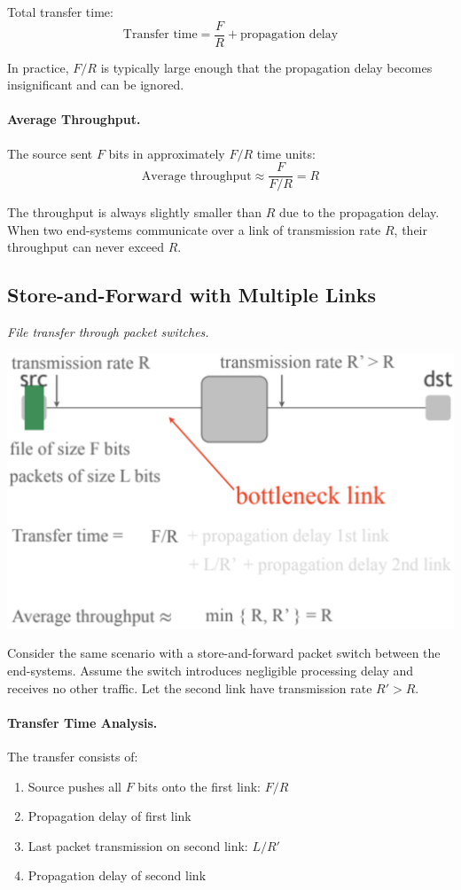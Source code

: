 \documentclass[../../compsys.tex]{subfiles}
\begin{document}
Total transfer time:
\[
\text{Transfer time} = \frac{F}{R} + \text{propagation delay}
\]

In practice, $F/R$ is typically large enough that the propagation delay becomes insignificant and can be ignored.

\paragraph{Average Throughput.} The source sent $F$ bits in approximately $F/R$ time units:
\[
\text{Average throughput} \approx \frac{F}{F/R} = R
\]

The throughput is always slightly smaller than $R$ due to the propagation delay. When two end-systems communicate over a link of transmission rate $R$, their throughput can never exceed $R$.

\subsection{Store-and-Forward with Multiple Links}
\textit{File transfer through packet switches.}

\begin{center}
  \includegraphics[width=.55\textwidth]{images/bottleneck_link.png}
\end{center}

Consider the same scenario with a store-and-forward packet switch between the end-systems. Assume the switch introduces negligible processing delay and receives no other traffic. Let the second link have transmission rate $R' > R$.

\paragraph{Transfer Time Analysis.} The transfer consists of:
\begin{enumerate}
  \item Source pushes all $F$ bits onto the first link: $F/R$
  \item Propagation delay of first link
  \item Last packet transmission on second link: $L/R'$
  \item Propagation delay of second link
\end{enumerate}
\end{document}

